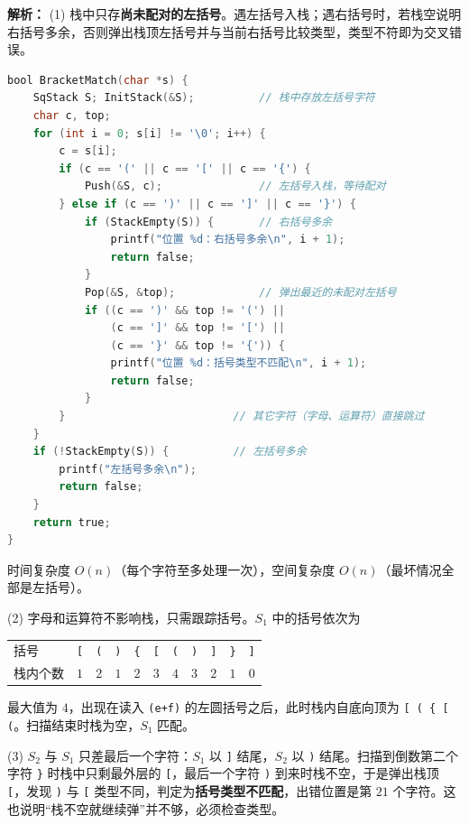\begin{enumerate}[resume]
\ifshowsolutions\par\noindent\textbf{解析：}
(1) 栈中只存\textbf{尚未配对的左括号}。遇左括号入栈；遇右括号时，若栈空说明右括号多余，否则弹出栈顶左括号并与当前右括号比较类型，类型不符即为交叉错误。
\begin{lstlisting}[language=C]
bool BracketMatch(char *s) {
    SqStack S; InitStack(&S);          // 栈中存放左括号字符
    char c, top;
    for (int i = 0; s[i] != '\0'; i++) {
        c = s[i];
        if (c == '(' || c == '[' || c == '{') {
            Push(&S, c);               // 左括号入栈，等待配对
        } else if (c == ')' || c == ']' || c == '}') {
            if (StackEmpty(S)) {       // 右括号多余
                printf("位置 %d：右括号多余\n", i + 1);
                return false;
            }
            Pop(&S, &top);             // 弹出最近的未配对左括号
            if ((c == ')' && top != '(') ||
                (c == ']' && top != '[') ||
                (c == '}' && top != '{')) {
                printf("位置 %d：括号类型不匹配\n", i + 1);
                return false;
            }
        }                          // 其它字符（字母、运算符）直接跳过
    }
    if (!StackEmpty(S)) {          // 左括号多余
        printf("左括号多余\n");
        return false;
    }
    return true;
}
\end{lstlisting}
时间复杂度 $O(n)$（每个字符至多处理一次），空间复杂度 $O(n)$（最坏情况全部是左括号）。

(2) 字母和运算符不影响栈，只需跟踪括号。$S_1$ 中的括号依次为
\begin{center}
\small
\begin{tabular}{l*{10}{c}}
\toprule
括号 & \texttt{[} & \texttt{(} & \texttt{)} & \texttt{\{} & \texttt{[} & \texttt{(} & \texttt{)} & \texttt{]} & \texttt{\}} & \texttt{]} \\
栈内个数 & $1$ & $2$ & $1$ & $2$ & $3$ & $4$ & $3$ & $2$ & $1$ & $0$ \\
\bottomrule
\end{tabular}
\end{center}
最大值为 $4$，出现在读入 \texttt{(e+f)} 的左圆括号之后，此时栈内自底向顶为 \texttt{[ ( \{ [ (}。扫描结束时栈为空，$S_1$ 匹配。

(3) $S_2$ 与 $S_1$ 只差最后一个字符：$S_1$ 以 \texttt{]} 结尾，$S_2$ 以 \texttt{)} 结尾。扫描到倒数第二个字符 \texttt{\}} 时栈中只剩最外层的 \texttt{[}，最后一个字符 \texttt{)} 到来时栈不空，于是弹出栈顶 \texttt{[}，发现 \texttt{)} 与 \texttt{[} 类型不同，判定为\textbf{括号类型不匹配}，出错位置是第 $21$ 个字符。这也说明“栈不空就继续弹”并不够，必须检查类型。
\par\noindent{}\else \answerarea[10] \fi


\end{enumerate}
